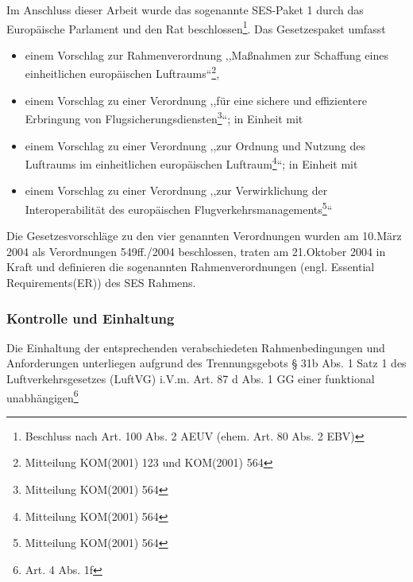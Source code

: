 Im Anschluss dieser Arbeit wurde das sogenannte SES-Paket 1 durch das Europäische Parlament und den Rat beschlossen\footnote{Beschluss nach Art. 100 Abs. 2 AEUV (ehem. Art. 80 Abs. 2 EBV)}.
Das Gesetzespaket umfasst 

\begin{itemize}
    \item einem Vorschlag zur Rahmenverordnung ,,Maßnahmen zur Schaffung eines einheitlichen europäischen Luftraums``\footnote{Mitteilung KOM(2001) 123 und KOM(2001) 564},
    \item einem Vorschlag zu einer Verordnung ,,für eine sichere und effizientere Erbringung von Flugsicherungsdiensten\footnote{Mitteilung KOM(2001) 564}``\cite[S. 12]{eu_ses_studie}; in Einheit mit
    \item  einem Vorschlag zu einer Verordnung ,,zur Ordnung und Nutzung des Luftraums im einheitlichen europäischen Luftraum\footnote{Mitteilung KOM(2001) 564}``\cite[S. 12]{eu_ses_studie}; in Einheit mit
    \item  einem Vorschlag zu einer Verordnung ,,zur Verwirklichung der Interoperabilität des europäischen Flugverkehrsmanagements\footnote{Mitteilung KOM(2001) 564}``\cite[S. 12]{eu_ses_studie}
\end{itemize}

Die Gesetzesvorschläge zu den vier genannten Verordnungen wurden am 10.März 2004 als Verordnungen 549ff./2004 beschlossen, traten am 21.Oktober 2004 in Kraft \cite[S.12]{eu_ses_studie} und definieren die sogenannten Rahmenverordnungen (engl. Essential Requirements(ER)) des SES Rahmens.



\subsubsection{Kontrolle und Einhaltung}

Die Einhaltung der entsprechenden verabschiedeten Rahmenbedingungen und Anforderungen unterliegen aufgrund des Trennungsgebots § 31b Abs. 1 Satz 1 des Luftverkehrsgesetzes (LuftVG) i.V.m. Art. 87 d Abs. 1 GG einer funktional unabhängigen\footnote{Art. 4 Abs. 1f}  \cite[S. 14]{eu_ses_studie} 